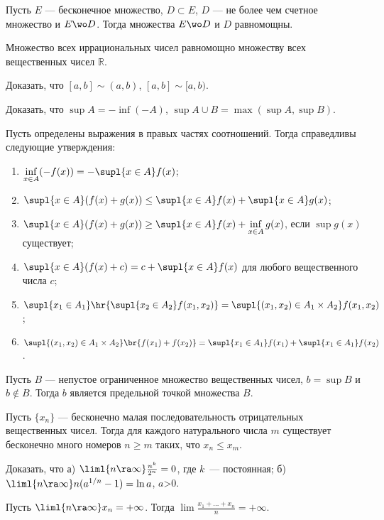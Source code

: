 \documentclass[a4paper]{article}
\begin{document}
\begin{nums}{-1}
\item Пусть $E$ --- бесконечное множество, $D\subset E$, $D$
--- не более чем счетное множество и $E\wo D$. Тогда
множества $E\wo D$ и $D$ равномощны.

\item Множество всех иррациональных чисел равномощно
множеству всех вещественных чисел $\mathbb{R}$.

\item Доказать, что $[a, b]\sim(a, b)$, $[a, b]\sim[a, b)$.

\item Доказать, что $\sup A=-\inf(-A)$, $\sup A\cup
B=\max(\sup A, \sup B)$.

\item Пусть определены выражения в правых частях соотношений.
Тогда справедливы следующие утверждения:
\begin{enumerate}
\item $ \inf\limits_{x\in A}(-f(x))=-\supl{x\in A} f(x)$;
\item $ \supl{x\in A} (f(x)+g(x))\leq \supl{x\in A} f(x)+\supl{x\in A} g(x)$;
\item $ \supl{x\in A}(f(x)+g(x))\ge \supl{x\in A}f(x)+\inf\limits_{x\in A}g(x)$, если $\sup g(x)$ существует;
\item $ \supl{x\in A}(f(x)+c)=c+\supl{x\in A} f(x)$ для любого вещественного числа $c$;
\item $\supl{x_1\in A_1}\hr{\supl{x_2\in A_2}f(x_1, x_2)}=\supl{(x_1, x_2)\in A_1\times A_2}f(x_1, x_2)$;
\item $\supl{(x_1, x_2)\in A_1\times A_2}\br{f(x_1)+f(x_2)}=\supl{x_1\in A_1}f(x_1)+\supl{x_1\in A_1}f(x_2)$.
\end{enumerate}

\item Пусть $B$ --- непустое ограниченное множество
вещественных чисел, $b =\sup B$ и $b\notin B$. Тогда $b$ является
предельной точкой множества $B$.

\item Пусть $\{x_n\}$ --- бесконечно малая последовательность
отрицательных вещественных чисел. Тогда для каждого натурального
числа $m$ существует бесконечно много номеров $n\ge m$ таких, что
$x_n\le x_m$.

\item Доказать, что а) $\liml{n\ra
\infty}\frac{n^k}{2^n}=0$, где $k$~--- постоянная; б)
$\liml{n\ra\infty}n(a^{1/n}-1)=\ln a$, $a$>0.

\item Пусть $\liml{n\ra\infty}x_n=+\infty$.
Тогда $\lim\limits\frac{x_1+\ldots +x_n}{n}=+\infty$.


\end{nums}
\end{document}

